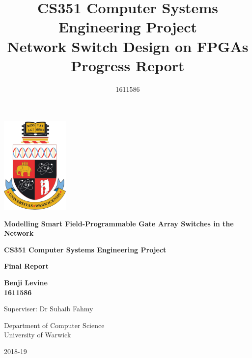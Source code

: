 \begin{titlepage}
   \begin{center}

      \includegraphics[width=0.25\textwidth]{warwick_logo_old.png}

      \vspace{1.5cm}
      \textbf{\Large{Modelling Smart Field-Programmable Gate Array Switches in the Network}}

      \vspace{1cm}
      \textbf{\large{CS351 Computer Systems Engineering Project}} \\
      \vspace{0.5cm}


      \textbf{\large{Final Report}}

      \vspace{2.7cm}

      \textbf{Benji Levine} \\
      \vspace{0.1cm}
      \textbf{1611586}

      \vspace{2.7cm}

      Superviser: Dr Suhaib Fahmy

      \vspace{0.8cm}

      Department of Computer Science\\
      University of Warwick

      \vspace{0.7cm}

      2018-19

   \end{center}
\end{titlepage}


\title{CS351 Computer Systems Engineering Project \\ \vspace{0.5cm} Network Switch Design on FPGAs \\ \vspace{0.3cm} \Large{Progress Report}}
\author{1611586}
